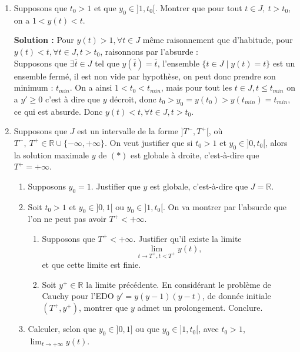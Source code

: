\documentclass[12pt,a4paper]{article}
\newcommand{\R}{\mathbb{R}}
\newcommand{\solution}[1]{\par\noindent\textbf{\color{OliveGreen}Solution :} \textcolor{OliveGreen}{#1}}
\begin{document}
\begin{exo}
\begin{enumerate}
{\begin{itemize}
\end{itemize}
}
    \item Supposons que $t_0>1$ et que $y_0\in]1,t_0[$. Montrer que pour tout $t\in J,\ t>t_0$, on a $1<y(t)<t$.
    \solution{Pour $y(t) > 1, \forall t \in J$ même raisonnement que d'habitude, pour $y(t) < t, \forall t \in J, t > t_0$, raisonnons par l'absurde :\\
    Supposons que $\exists \bar{t} \in J$  tel que $y(\bar{t}) = \bar{t}$, l'ensemble $\{t \in J \mid y(t) = t \}$ est un ensemble fermé, il est non vide par hypothèse, on peut donc prendre son minimum : $t_{min}$. On a ainsi $1 < t_0 < t_{min}$, mais pour tout les $t\in J, t \leq t_{min}$ on a $y' \geq 0$ c'est à dire que $y$ décroit, donc $t_0 > y_0 = y(t_0) > y(t_{min}) = t_{min}$, ce qui est absurde. Donc $y(t) < t, \forall t \in J, t > t_0$.
    }
    \item Supposons que $J$ est un intervalle de la forme $]T^-,T^+[$, où $T^-,\ T^+\in\R\cup\{-\infty,+\infty\}$. On veut justifier que si $t_0>1$ et $y_0\in]0,t_0[$, alors la solution maximale $y$ de $(*)$ est globale à droite, c'est-à-dire que $T^+=+\infty$.
        \begin{enumerate}
        \item Supposons $y_0=1$. Justifier que $y$ est globale, c'est-à-dire que $J=\R$.
        \item Soit $t_0>1$ et $y_0\in]0,1[$ ou $y_0\in]1,t_0[$. On va montrer par l'absurde que l'on ne peut pas avoir $T^+<+\infty$.          
              \begin{enumerate}
                \item Supposons que $T^+<+\infty$. Justifier qu'il existe la limite
        $$
\lim_{t\to T^+,t<T^+}y(t),
$$
et que cette limite est finie.
\item Soit $y^+\in\R$ la limite précédente. En considérant le problème de Cauchy pour l'EDO $y'=y(y-1)(y-t)$, de donnée initiale $(T^+,y^+)$, montrer que $y$ admet un prolongement. Conclure.
        \end{enumerate}
        \item Calculer, selon que $y_0\in]0,1]$ ou que $y_0\in]1,t_0[$, avec $t_0>1$, $\lim_{t\to+\infty}y(t)$.
        \end{enumerate}
        \end{enumerate}
\end{exo}

\end{document}
